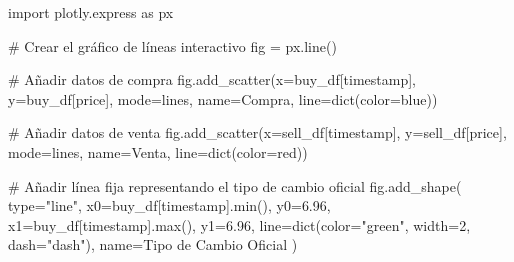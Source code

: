 \documentclass[
  letterpaper,
  DIV=11,
  numbers=noendperiod]{scrartcl}
\newenvironment{Shaded}{\begin{snugshade}}{\end{snugshade}}
\newcommand{\BuiltInTok}[1]{\textcolor[rgb]{0.00,0.23,0.31}{#1}}
\newcommand{\CommentTok}[1]{\textcolor[rgb]{0.37,0.37,0.37}{#1}}
\newcommand{\DecValTok}[1]{\textcolor[rgb]{0.68,0.00,0.00}{#1}}
\newcommand{\FloatTok}[1]{\textcolor[rgb]{0.68,0.00,0.00}{#1}}
\newcommand{\ImportTok}[1]{\textcolor[rgb]{0.00,0.46,0.62}{#1}}
\newcommand{\NormalTok}[1]{\textcolor[rgb]{0.00,0.23,0.31}{#1}}
\newcommand{\OperatorTok}[1]{\textcolor[rgb]{0.37,0.37,0.37}{#1}}
\newcommand{\StringTok}[1]{\textcolor[rgb]{0.13,0.47,0.30}{#1}}
\begin{document}
\begin{Shaded}
\begin{Highlighting}[]
\ImportTok{import}\NormalTok{ plotly.express }\ImportTok{as}\NormalTok{ px}

\CommentTok{\# Crear el gráfico de líneas interactivo}
\NormalTok{fig }\OperatorTok{=}\NormalTok{ px.line()}

\CommentTok{\# Añadir datos de compra}
\NormalTok{fig.add\_scatter(x}\OperatorTok{=}\NormalTok{buy\_df[}\StringTok{\textquotesingle{}timestamp\textquotesingle{}}\NormalTok{], y}\OperatorTok{=}\NormalTok{buy\_df[}\StringTok{\textquotesingle{}price\textquotesingle{}}\NormalTok{],}
\NormalTok{                mode}\OperatorTok{=}\StringTok{\textquotesingle{}lines\textquotesingle{}}\NormalTok{, name}\OperatorTok{=}\StringTok{\textquotesingle{}Compra\textquotesingle{}}\NormalTok{, line}\OperatorTok{=}\BuiltInTok{dict}\NormalTok{(color}\OperatorTok{=}\StringTok{\textquotesingle{}blue\textquotesingle{}}\NormalTok{))}

\CommentTok{\# Añadir datos de venta}
\NormalTok{fig.add\_scatter(x}\OperatorTok{=}\NormalTok{sell\_df[}\StringTok{\textquotesingle{}timestamp\textquotesingle{}}\NormalTok{], y}\OperatorTok{=}\NormalTok{sell\_df[}\StringTok{\textquotesingle{}price\textquotesingle{}}\NormalTok{],}
\NormalTok{                mode}\OperatorTok{=}\StringTok{\textquotesingle{}lines\textquotesingle{}}\NormalTok{, name}\OperatorTok{=}\StringTok{\textquotesingle{}Venta\textquotesingle{}}\NormalTok{, line}\OperatorTok{=}\BuiltInTok{dict}\NormalTok{(color}\OperatorTok{=}\StringTok{\textquotesingle{}red\textquotesingle{}}\NormalTok{))}

\CommentTok{\# Añadir línea fija representando el tipo de cambio oficial}
\NormalTok{fig.add\_shape(}
    \BuiltInTok{type}\OperatorTok{=}\StringTok{"line"}\NormalTok{,}
\NormalTok{    x0}\OperatorTok{=}\NormalTok{buy\_df[}\StringTok{\textquotesingle{}timestamp\textquotesingle{}}\NormalTok{].}\BuiltInTok{min}\NormalTok{(),}
\NormalTok{    y0}\OperatorTok{=}\FloatTok{6.96}\NormalTok{,}
\NormalTok{    x1}\OperatorTok{=}\NormalTok{buy\_df[}\StringTok{\textquotesingle{}timestamp\textquotesingle{}}\NormalTok{].}\BuiltInTok{max}\NormalTok{(),}
\NormalTok{    y1}\OperatorTok{=}\FloatTok{6.96}\NormalTok{,}
\NormalTok{    line}\OperatorTok{=}\BuiltInTok{dict}\NormalTok{(color}\OperatorTok{=}\StringTok{"green"}\NormalTok{, width}\OperatorTok{=}\DecValTok{2}\NormalTok{, dash}\OperatorTok{=}\StringTok{"dash"}\NormalTok{),}
\NormalTok{    name}\OperatorTok{=}\StringTok{\textquotesingle{}Tipo de Cambio Oficial\textquotesingle{}}
\NormalTok{)}


\end{Highlighting}
\end{Shaded}
\end{document}
